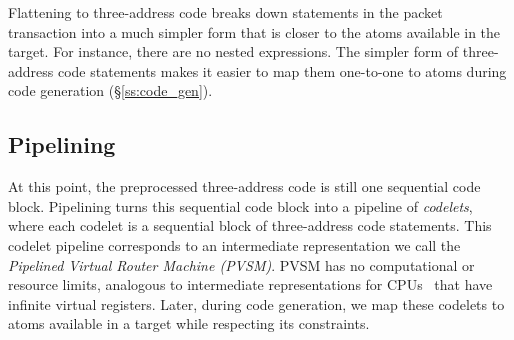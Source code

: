 Flattening to three-address code breaks down statements in the packet
transaction into a much simpler form that is closer to the atoms available in
the \absmachine target. For instance, there are no nested expressions. The
simpler form of three-address code statements makes it easier to map them
one-to-one to atoms during code generation (\S\ref{ss:code_gen}).

\subsection{Pipelining}
\label{ss:pipelining}
At this point, the preprocessed three-address code is still one sequential code
block.  Pipelining turns this sequential code block into a pipeline of
\textit{codelets}, where each codelet is a sequential block of three-address
code statements. This codelet pipeline corresponds to an intermediate
representation we call the \textit{Pipelined Virtual Router Machine (PVSM)}.
PVSM has no computational or resource limits, analogous to intermediate
representations for CPUs~\cite{llvm} that have infinite virtual registers.
Later, during code generation, we map these codelets to atoms available in a
\absmachine target while respecting its constraints.

